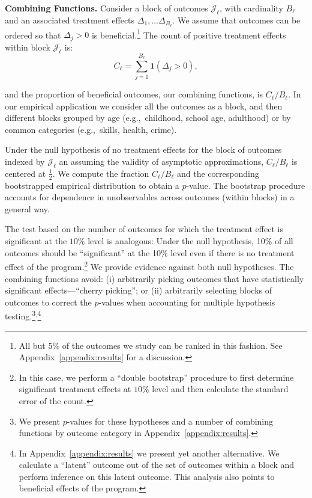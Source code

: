 \textbf{Combining Functions.} Consider a block of outcomes $\mathcal{J}_{\ell}$, with cardinality $B_{\ell}$ and an associated treatment effects $\Delta_1, \ldots \Delta_{B_\ell}$. We assume that outcomes can be ordered so that $\Delta_{j} >0$ is beneficial.\footnote{All but 5\% of the outcomes we study can be ranked in this fashion. See Appendix~\ref{appendix:results} for a discussion.} The count of positive treatment effects within block $\mathcal{J}_{\ell}$ is:
\begin{equation}
C_\ell = \sum^{B_\ell}_{j=1} \bm{1} (\Delta_{j} >0), 
\end{equation}

\noindent and the proportion of beneficial outcomes, our combining functions, is $C_\ell / B_\ell$. In our empirical application we consider all the outcomes as a block, and then different blocks grouped by age (e.g.,\ childhood, school age, adulthood) or by common categories (e.g.,\ skills, health, crime).

Under the null hypothesis of no treatment effects for the block of outcomes indexed by $\mathcal{J}_\ell$ an assuming the validity of asymptotic approximations, $C_\ell / B_\ell$ is centered at $\frac{1}{2}$. We compute the fraction $C_\ell / B_\ell$ and the corresponding bootstrapped empirical distribution to obtain a $p$-value. The bootstrap procedure accounts for dependence in unobservables across outcomes (within blocks) in a general way. 

The test based on the number of outcomes for which the treatment effect is significant at the $10\%$ level is analogous: Under the null hypothesis, 10\% of all outcomes should be ``significant'' at the 10\% level even if there is no treatment effect of the program.\footnote{In this case, we perform a ``double bootstrap'' procedure to first determine significant treatment effects at $10\%$ level and then calculate the standard error of the count.} We provide evidence against both null hypotheses. The combining functions avoid: (i) arbitrarily picking outcomes that have statistically significant effects---``cherry picking''; or (ii) arbitrarily selecting blocks of outcomes to correct the $p$-values when accounting for multiple hypothesis testing.\footnote{We present $p$-values for these hypotheses and a number of combining functions by outcome category in Appendix~\ref{appendix:results}.}$^{\text{,}}$\footnote{In Appendix~\ref{appendix:results} we present yet another alternative. We calculate a ``latent'' outcome out of the set of outcomes within a block and perform inference on this latent outcome. This analysis also points to beneficial effects of the program.} 

